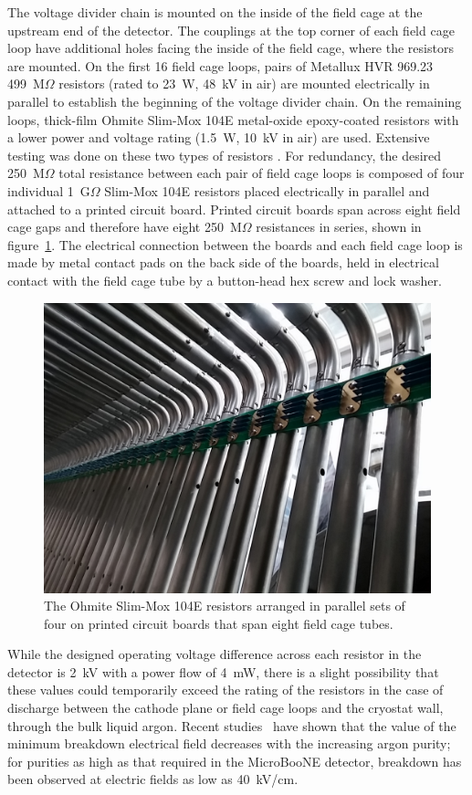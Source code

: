 The voltage divider chain is mounted on the inside of the field cage at the upstream end of the detector. The couplings at the top corner of each field cage loop have additional holes facing the inside of the field cage, where the resistors are mounted. On the first 16 field cage loops, pairs of Metallux HVR 969.23 499~M$\Omega$ resistors (rated to 23~W, 48~kV in air) are mounted electrically in parallel to establish the beginning of the voltage divider chain. On the remaining loops, thick-film Ohmite Slim-Mox 104E metal-oxide epoxy-coated resistors with a lower power and voltage rating (1.5~W, 10~kV in air) are used. Extensive testing was done on these two types of resistors \cite{Bagby:2014wva}. For redundancy, the desired 250~M$\Omega$ total resistance between each pair of field cage loops is composed of four individual 1~G$\Omega$ Slim-Mox 104E resistors placed electrically in parallel and attached to a printed circuit board. Printed circuit boards span across eight field cage gaps and therefore have eight 250~M$\Omega$ resistances in series, shown in figure~\ref{fig:tpc-voltage-divider-slimmox}. The electrical connection between the boards and each field cage loop is made by metal contact pads on the back side of the boards, held in electrical contact with the field cage tube by a button-head hex screw and lock washer.

\begin{figure}[htb]
\centering	
\includegraphics[width=0.8\linewidth]{figures/tpc-voltage-divider-slimmox.jpg}
\caption{The Ohmite Slim-Mox 104E resistors arranged in parallel sets of four on printed circuit boards that span eight field cage tubes.}
\label{fig:tpc-voltage-divider-slimmox}
\end{figure}

While the designed operating voltage difference across each resistor in the detector is 2~kV with a power flow of 4~mW, there is a slight possibility that these values could temporarily exceed the rating of the resistors in the case of discharge between the cathode plane or field cage loops and the cryostat wall, through the bulk liquid argon. Recent studies~\cite{Acciarri:2014ica} have shown that the value of the minimum breakdown electrical field decreases with the increasing argon purity; for purities as high as that required in the MicroBooNE detector, breakdown has been observed at electric fields as low as 40~kV/cm.

